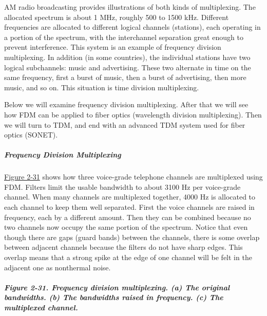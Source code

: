 AM radio broadcasting provides illustrations of both kinds of
multiplexing. The allocated spectrum is about 1 MHz, roughly 500 to 1500
kHz. Different frequencies are allocated to different logical channels
(stations), each operating in a portion of the spectrum, with the
interchannel separation great enough to prevent interference. This
system is an example of frequency division multiplexing. In addition (in
some countries), the individual stations have two logical subchannels:
music and advertising. These two alternate in time on the same
frequency, first a burst of music, then a burst of advertising, then
more music, and so on. This situation is time division multiplexing.

Below we will examine frequency division multiplexing. After that we
will see how FDM can be applied to fiber optics (wavelength division
multiplexing). Then we will turn to TDM, and end with an advanced TDM
system used for fiber optics (SONET).

\protect\hypertarget{0130661023_ch02lev1sec5.htmlux5cux23ch02lev3sec12}{}{}

\subparagraph{Frequency Division Multiplexing}

\protect\hyperlink{0130661023_ch02lev1sec5.htmlux5cux23ch02fig31}{Figure
2-31} shows how three voice-grade telephone channels are multiplexed
using FDM. Filters limit the usable bandwidth to about 3100 Hz per
voice-grade channel. When many channels are multiplexed together, 4000
Hz is allocated to each channel to keep them well separated. First the
voice channels are raised in frequency, each by a different amount. Then
they can be combined because no two channels now occupy the same portion
of the spectrum. Notice that even though there are gaps (guard bands)
between the channels, there is some overlap between adjacent channels
because the filters do not have sharp edges. This overlap means that a
strong spike at the edge of one channel will be felt in the adjacent one
as nonthermal noise.

\subparagraph[Figure 2-31. Frequency division multiplexing. (a) The
original bandwidths. (b) The bandwidths raised in frequency. (c) The
multiplexed
channel.]{\texorpdfstring{\protect\hypertarget{0130661023_ch02lev1sec5.htmlux5cux23ch02fig31}{}{}Figure
2-31. Frequency division multiplexing. (a) The original bandwidths. (b)
The bandwidths raised in frequency. (c) The multiplexed
channel.}{Figure 2-31. Frequency division multiplexing. (a) The original bandwidths. (b) The bandwidths raised in frequency. (c) The multiplexed channel.}}

